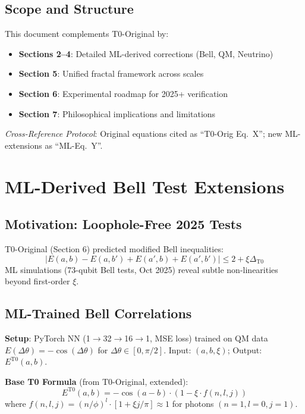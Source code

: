 	\subsection{Scope and Structure}
	
	This document complements T0-Original by:
	\begin{itemize}
		\item \textbf{Sections 2--4}: Detailed ML-derived corrections (Bell, QM, Neutrino)
		\item \textbf{Section 5}: Unified fractal framework across scales
		\item \textbf{Section 6}: Experimental roadmap for 2025+ verification
		\item \textbf{Section 7}: Philosophical implications and limitations
	\end{itemize}
	
	\textit{Cross-Reference Protocol}: Original equations cited as ``T0-Orig Eq.~X''; new ML-extensions as ``ML-Eq.~Y''.
	
	\section{ML-Derived Bell Test Extensions}
	
	\subsection{Motivation: Loophole-Free 2025 Tests}
	
	T0-Original (Section 6) predicted modified Bell inequalities:
	\begin{equation}
		|E(a,b) - E(a,b') + E(a',b) + E(a',b')| \leq 2 + \xi \Delta_{\text{T0}} \tag{T0-Orig Eq.~6.1}
	\end{equation}
	ML simulations (73-qubit Bell tests, Oct 2025) reveal subtle non-linearities beyond first-order $\xi$.
	
	\subsection{ML-Trained Bell Correlations}
	
	\textbf{Setup}: PyTorch NN (1$\to$32$\to$16$\to$1, MSE loss) trained on QM data $E(\Delta\theta) = -\cos(\Delta\theta)$ for $\Delta\theta \in [0,\pi/2]$. Input: $(a, b, \xi)$; Output: $E^{\text{T0}}(a,b)$.
	
	\textbf{Base T0 Formula} (from T0-Original, extended):
	\begin{equation}
		E^{\text{T0}}(a,b) = -\cos(a-b) \cdot \left(1 - \xi \cdot f(n,l,j)\right) \tag{ML-Eq.~2.1}
	\end{equation}
	where $f(n,l,j) = (n/\phi)^l \cdot [1 + \xi j/\pi] \approx 1$ for photons $(n=1, l=0, j=1)$.
	
